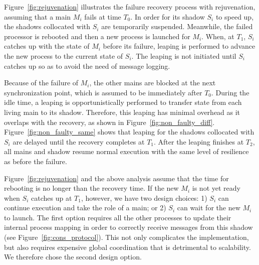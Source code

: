 Figure~\ref{fig:rejuvenation} illustrates the failure recovery process with rejuvenation, assuming that a main $M_i$ fails at time $T_0$.
In order for its shadow $S_i$ to speed up, the shadows collocated with $S_i$ are temporarily suspended. %
Meanwhile, the failed processor is rebooted and then a new process is launched for $M_i$. When, at $T_1$, $S_i$ catches up with the state of $M_i$ before its failure, leaping is performed to advance the new process to the current state of $S_i$. The leaping is not initiated until $S_i$ catches up so as to avoid the need of message logging. 

Because of the failure of $M_i$, the other mains are blocked at the next synchronization point, which is assumed to be immediately after $T_0$. During the idle time, a leaping is opportunistically performed to transfer state from each living main to its shadow. Therefore, this leaping has minimal overhead as it overlaps with the recovery, as shown in Figure~\ref{fig:non_faulty_diff}. Figure~\ref{fig:non_faulty_same} shows that leaping for the shadows collocated with $S_i$ are delayed until the recovery completes at $T_1$. After the leaping finishes at $T_2$, all mains and shadow resume normal execution with the same level of resilience as before the failure.

Figure~\ref{fig:rejuvenation} and the above analysis assume that the time for rebooting is no longer than the recovery time. If the new $M_i$ is not yet ready when $S_i$ catches up at $T_1$, however, we have two design choices: 1) $S_i$ can continue execution and take the role of a main; or 2) $S_i$ can wait for the new $M_i$ to launch. The first option requires all the other processes to update their internal process mapping in order to correctly receive messages from this shadow (see Figure~\ref{fig:cons_protocol}). This not only complicates the implementation, but also requires expensive global coordination that is detrimental to scalability. We therefore chose the second design option.




